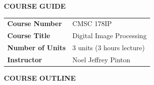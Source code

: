 \documentclass[a4paper,10pt]{article}
\begin{document}
\begin{center}
    \textbf{\Large COURSE GUIDE}
\end{center}
\vspace{0.5em}

\begin{tabular}{ll}
\textbf{Course Number}   & CMSC 178IP \\
\textbf{Course Title}    & Digital Image Processing \\
\textbf{Number of Units} & 3 units (3 hours lecture) \\
\textbf{Instructor}      & Noel Jeffrey Pinton \\
\end{tabular}

\vspace{1.5em}

\begin{center}
    \textbf{\Large COURSE OUTLINE}
\end{center}
\end{document}
